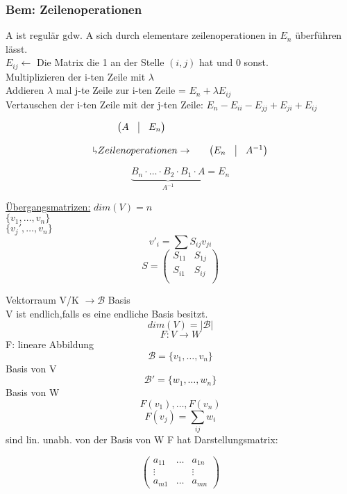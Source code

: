 \documentclass[titlepage,12pt,a4paper,ngerman]{report}
\begin{document}
\subsubsection{Bem: Zeilenoperationen}
A ist regulär gdw. A sich durch elementare zeilenoperationen in $E_n$ überführen lässt.\\
$E_{ij} \leftarrow$ Die Matrix die 1 an der Stelle $(i,j)$ hat und 0 sonst.\\
Multiplizieren der i-ten Zeile mit $\lambda$ \\
Addieren $\lambda$ mal j-te Zeile zur i-ten Zeile = $E_n + \lambda E_{ij}$ \\
Vertauschen der i-ten Zeile mit der j-ten Zeile: $E_n - E_{ii} -E_{jj} + E_{ji} + E_{ij}$

$$\begin{array}{cccc}
\begin{pmatrix}
A & \vline & E_n 
\end{pmatrix} &&  \\\\
\rotatebox[origin=c]{180}{$\Lsh$} Zeilenoperationen \rightarrow & &\begin{pmatrix}
E_n & \vline & A^{-1}
\end{pmatrix} \\
\end{array}$$

$$\underbrace{B_n \cdot \dots \cdot B_2 \cdot B_1 \cdot A}_{ A^{-1}} = E_n$$

\noindent \underline{Übergangsmatrizen:}
$dim(V) = n$\\
$\{v_1, \dots , v_n\}$\\
$\{v_j', \dots , v_n\}$\\
$$v'_i = \sum S_{ij} v_{ji}$$
$$S = \begin{pmatrix}
S_{11} & S_{1j} \\
S_{i1} & S_{ij} \\
\end{pmatrix}$$


Vektorraum V/K
$\rightarrow \mathcal{B}$ Basis\\
V ist endlich,falls es eine endliche Basis besitzt.
$$dim(V) = \vert \mathcal{B} \vert$$
$$F: V\to W$$
F: lineare Abbildung
$$\mathcal{B} = \{v_1, \dots , v_n\}$$ Basis von V 
$$\mathcal{B}' = \{w_1, \dots , w_n\}$$ Basis von W 
$$ F(v_1), \dots , F(v_n)$$ 
$$ F(v_j) = \sum _{ij} w_i$$
sind lin. unabh. von der Basis von W
F hat Darstellungsmatrix:

$$\begin{pmatrix}
a_{11} & \dots & a_{1n} \\
\vdots & & \vdots \\
a_{m1} & \dots & a_{mn}
\end{pmatrix}$$
\end{document}
